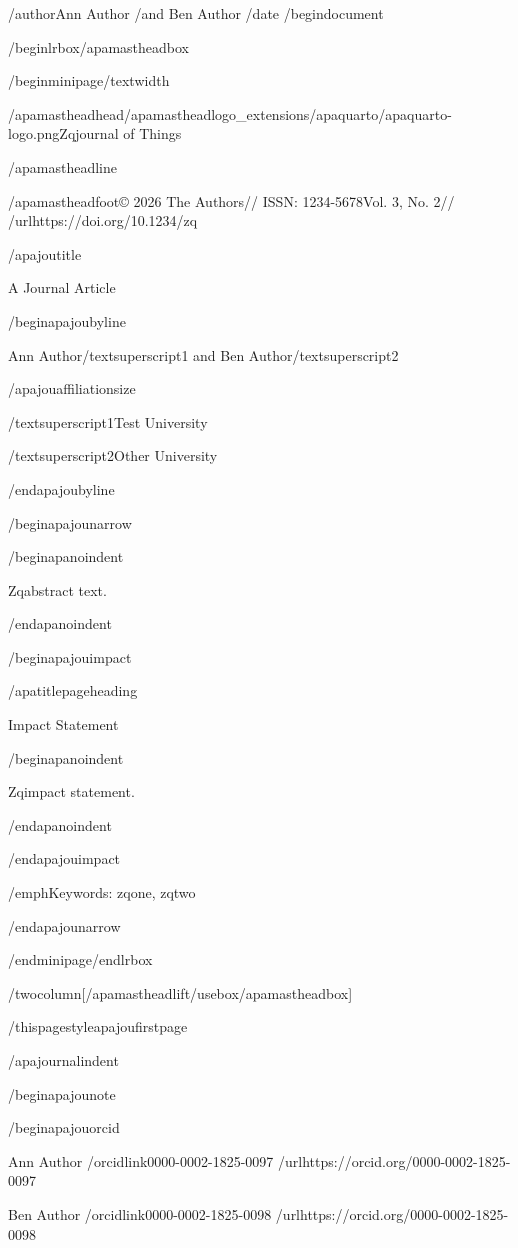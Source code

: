 /author{Ann Author /and Ben Author}
/date{}
/begin{document}


/begin{lrbox}{/apamastheadbox}%

/begin{minipage}{/textwidth}

/apamastheadhead{/apamastheadlogo{_extensions/apaquarto/apaquarto-logo.png}}{Zqjournal
of Things}

/apamastheadline

/apamastheadfoot{© 2026 The Authors//
ISSN: 1234-5678}{Vol. 3, No. 2//
/url{https://doi.org/10.1234/zq}}

/apajoutitle{

A Journal Article

}

/begin{apajoubyline}

Ann Author/textsuperscript{1} and Ben Author/textsuperscript{2}

/apajouaffiliationsize

/textsuperscript{1}Test University

/textsuperscript{2}Other University

/end{apajoubyline}

/begin{apajounarrow}

/begin{apanoindent}

Zqabstract text.

/end{apanoindent}

/begin{apajouimpact}

/apatitlepageheading{

Impact Statement

}

/begin{apanoindent}

Zqimpact statement.

/end{apanoindent}

/end{apajouimpact}

/emph{Keywords}: zqone, zqtwo

/end{apajounarrow}

/end{minipage}/end{lrbox}

/twocolumn[/apamastheadlift/usebox{/apamastheadbox}]

/thispagestyle{apajoufirstpage}

/apajournalindent

/begin{apajounote}

/begin{apajouorcid}

Ann Author /orcidlink{0000-0002-1825-0097}
/url{https://orcid.org/0000-0002-1825-0097}

Ben Author /orcidlink{0000-0002-1825-0098}
/url{https://orcid.org/0000-0002-1825-0098}

